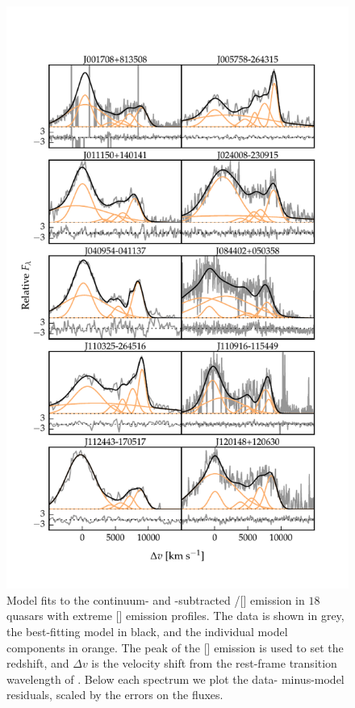 \begin{figure}
    \centering
    \includegraphics[width=\columnwidth]{figures/chapter04/example_spectrum_grid_extreme_oiii_1.pdf} 
    \caption[{Model fits to the continuum- and -subtracted \hbns/[] emission in $18$ quasars with extreme [] emission profiles.}]{Model fits to the continuum- and -subtracted \hbns/[] emission in $18$ quasars with extreme [] emission profiles. The data is shown in grey, the best-fitting model in black, and the individual model components in orange. The peak of the [] emission is used to set the redshift, and $\Delta{v}$ is the velocity shift from the rest-frame transition wavelength of \hbns. Below each spectrum we plot the data- minus-model residuals, scaled by the errors on the fluxes.}     
    \label{fig:example_spectrum_grid_extreme_oiii}
\end{figure}

